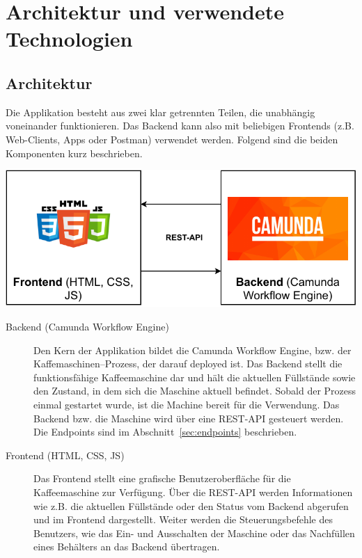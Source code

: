 \chapter{Architektur und verwendete Technologien}\label{ch:architektur-und-verwendete-technologien}


\section{Architektur}\label{sec:architektur}
Die Applikation besteht aus zwei klar getrennten Teilen, die unabhängig voneinander funktionieren.
Das Backend kann also mit beliebigen Frontends (z.B. Web-Clients, Apps oder Postman) verwendet werden.
Folgend sind die beiden Komponenten kurz beschrieben.

\begin{center}
   \includegraphics[width=1\textwidth]{resources/architecture}
\end{center}


\begin{description}
   \item[Backend (Camunda Workflow Engine)] Den Kern der Applikation bildet die Camunda Workflow Engine, bzw. der Kaffemaschinen--Prozess, der darauf deployed ist.
   Das Backend stellt die funktionsfähige Kaffeemaschine dar und hält die aktuellen Füllstände sowie den Zustand, in dem sich die Maschine aktuell befindet.
   Sobald der Prozess einmal gestartet wurde, ist die Machine bereit für die Verwendung.
   Das Backend bzw. die Maschine wird über eine REST-API gesteuert werden.
   Die Endpoints sind im Abschnitt~\ref{sec:endpoints} beschrieben.
   \item[Frontend (HTML, CSS, JS)] Das Frontend stellt eine grafische Benutzeroberfläche für die Kaffeemaschine zur Verfügung.
   Über die REST-API werden Informationen wie z.B. die aktuellen Füllstände oder den Status vom Backend abgerufen und im Frontend dargestellt.
   Weiter werden die Steuerungsbefehle des Benutzers, wie das Ein- und Ausschalten der Maschine oder das Nachfüllen eines Behälters an das Backend übertragen.
\end{description}


